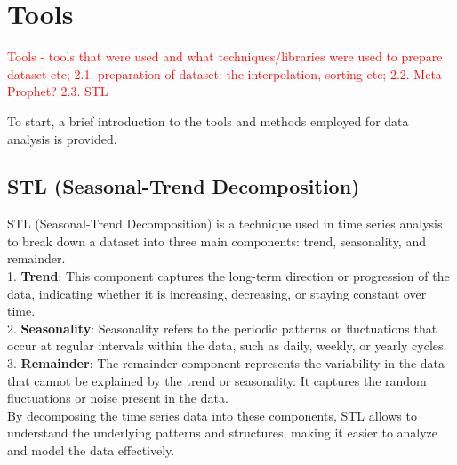 \section{Tools}
\noindent

\textcolor{red}{Tools - tools that were used and what techniques/libraries were used to prepare dataset etc; 
2.1. preparation of dataset: the interpolation, sorting etc;
2.2. Meta Prophet?
2.3. STL}

To start, a brief introduction to the tools and methods employed for data analysis is provided.
\vspace{-15pt}

\subsection{STL (Seasonal-Trend Decomposition)}
STL (Seasonal-Trend Decomposition) is a technique used in time series analysis to break down a dataset into three main components: trend, seasonality, and remainder. \\
1. \textbf{Trend}: This component captures the long-term direction or progression of the data, indicating whether it is increasing, decreasing, or staying constant over time. \\
2. \textbf{Seasonality}: Seasonality refers to the periodic patterns or fluctuations that occur at regular intervals within the data, such as daily, weekly, or yearly cycles. \\
3. \textbf{Remainder}: The remainder component represents the variability in the data that cannot be explained by the trend or seasonality. It captures the random fluctuations or noise present in the data. \\
By decomposing the time series data into these components, STL allows to understand the underlying patterns and structures, making it easier to analyze and model the data effectively.

\vspace{-15pt}

